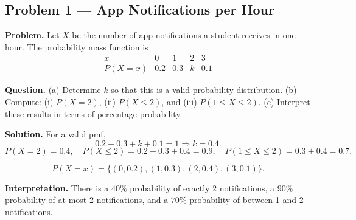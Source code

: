 


	
	
	\begin{ExamProblems}
		\item
		\subsection*{Problem 1 — App Notifications per Hour}
		
		\textbf{Problem.}
		Let $X$ be the number of app notifications a student receives in one hour. The probability mass function is
		\[
		\begin{array}{c|cccc}
			x & 0 & 1 & 2 & 3\\
			\hline
			P(X=x) & 0.2 & 0.3 & k & 0.1
		\end{array}
		\]
		
		\textbf{Question.}
		(a) Determine $k$ so that this is a valid probability distribution.
		(b) Compute: (i) $P(X=2)$, (ii) $P(X\le 2)$, and (iii) $P(1\le X\le 2)$.
		(c) Interpret these results in terms of percentage probability.
		
		\textbf{Solution.}
		For a valid pmf,
		\[
		0.2+0.3+k+0.1=1\Rightarrow k=0.4.
		\]
		\[
		P(X=2)=0.4,\quad
		P(X\le 2)=0.2+0.3+0.4=0.9,\quad
		P(1\le X\le 2)=0.3+0.4=0.7.
		\]
		
\[
		P(X=x)=\{(0,0.2),(1,0.3),(2,0.4),(3,0.1)\}.
		\]
\begin{center}
		\end{center}
\textbf{Interpretation.} There is a $40\%$ probability of exactly 2 notifications, a $90\%$ probability of at most 2 notifications, and a $70\%$ probability of between 1 and 2 notifications.
		
		

\end{ExamProblems}
